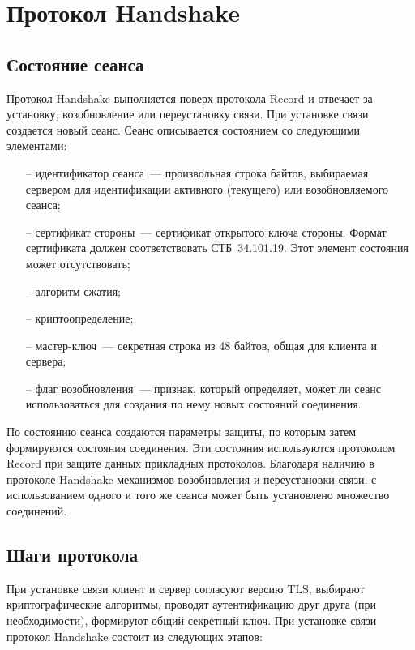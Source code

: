 \chapter{Протокол Handshake}\label{HANDSHAKE}

\section{Состояние сеанса}\label{HANDSHAKE.1}

Протокол Handshake выполняется поверх протокола 
Record и отвечает за установку, возобновление или 
переустановку связи. При установке связи создается новый сеанс. Сеанс 
описывается состоянием со следующими элементами: 
%
\begin{itemize}
\item[--]
идентификатор сеанса~--- произвольная строка байтов, выбираемая 
сервером для идентификации активного (текущего) или возобновляемого 
сеанса; 

\item[--]
сертификат стороны~--- сертификат открытого ключа стороны. Формат 
сертификата должен соответствовать СТБ~34.101.19. Этот элемент состояния 
может отсутствовать;
 
\item[--]
алгоритм сжатия;

\item[--]
криптоопределение;

\item[--]
мастер-ключ~--- секретная строка из 48 байтов, общая для клиента и сервера;

\item[--]
флаг возобновления~--- признак, который определяет, может ли сеанс 
использоваться для создания по нему новых состояний соединения. 
\end{itemize}

По состоянию сеанса создаются параметры защиты, по которым затем 
формируются состояния соединения. Эти состояния используются протоколом 
Record при защите данных прикладных протоколов. Благодаря наличию в 
протоколе Handshake механизмов возобновления и переустановки связи, с 
использованием одного и того же сеанса может быть установлено множество 
соединений. 

\section{Шаги протокола}\label{HANDSHAKE.2}

При установке связи клиент и сервер согласуют версию TLS, выбирают 
криптографические алгоритмы, проводят аутентификацию друг друга (при 
необходимости), формируют общий секретный ключ. При установке связи 
протокол Handshake состоит из следующих этапов: 

